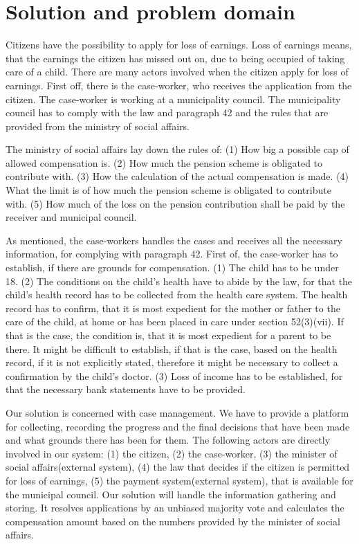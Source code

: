 \section{Solution and problem domain}
Citizens have the possibility to apply for loss of earnings. Loss of earnings means, that the earnings the citizen has missed out on, due to being occupied of taking care of a child. There are many actors involved when the citizen apply for loss of earnings. First off, there is the case-worker, who receives the application from the citizen. The case-worker is working at a municipality council. The municipality council has to comply with the law and paragraph 42 and the rules that are provided from the ministry of social affairs.

\vspace{2mm}

The ministry of social affairs lay down the rules of:
(1) How big a possible cap of allowed compensation is.
(2) How much the pension scheme is obligated to contribute with. (3) How the calculation of the actual compensation is made. (4) What the limit is of how much the pension scheme is obligated to contribute with. (5) How much of the loss on the pension contribution shall be paid by the receiver and municipal council.

\vspace{2mm}

As mentioned, the case-workers handles the cases and receives all the necessary information, for complying with paragraph 42. First of, the case-worker has to establish, if there are grounds for compensation. (1) The child has to be under 18. (2) The conditions on the child's health have to abide by the law, for that the child's health record has to be collected from the health care system. The health record has to confirm, that it is most expedient for the mother or father to the care of the child, at home or has been placed in care under section 52(3)(vii). If that is the case, the condition is, that it is most expedient for a parent to be there. It might be difficult to establish, if that is the case, based on the health record, if it is not explicitly stated, therefore it might be necessary to collect a confirmation by the child's doctor. (3) Loss of income has to be established, for that the necessary bank statements have to be provided.

\vspace{2mm}

Our solution is concerned with case management. We have to provide a platform for collecting, recording the progress and the final decisions that have been made and what grounds there has been for them. The following actors are directly involved in our system: (1) the citizen, (2) the case-worker, (3) the minister of social affairs(external system), (4) the law that decides if the citizen is permitted for loss of earnings, (5) the payment system(external system), that is available for the municipal council. Our solution will handle the information gathering and storing. It resolves applications by an unbiased majority vote and calculates the compensation amount based on the numbers provided by the minister of social affairs.

